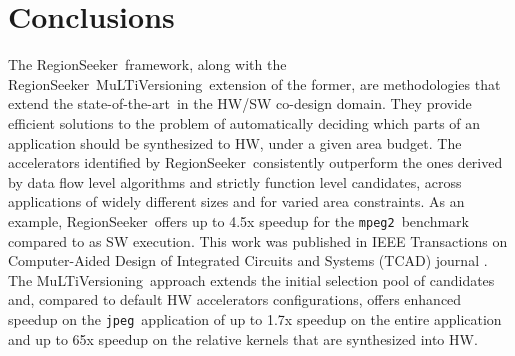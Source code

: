 \documentclass[]{usiinfthesis}
\newcommand{\rseeker}{{RegionSeeker}}
\newcommand{\multi}{MuLTiVersioning}
\newcommand{\SoTA}{{state-of-the-art}}
\newcommand{\jpeg}{\texttt{jpeg}}
\newcommand{\mpeg}{\texttt{mpeg2}}
\begin{document}





\section{Conclusions}
\label{sec:rs_conclusions}

The \rseeker\ framework, along with the \rseeker\ \multi\ extension of the former, are
methodologies that extend the \SoTA\ in the HW/SW co-design domain. They provide
efficient solutions to the problem of automatically deciding which parts of an application should
be synthesized to HW, under a given area budget. The accelerators identified by \rseeker\ 
consistently outperform the ones derived by data flow level algorithms and strictly function 
level candidates, across applications of widely different sizes and for varied area constraints.
As an example, \rseeker\ offers up to 4.5x speedup for the \mpeg\ benchmark compared to as SW
execution. This work was published in IEEE Transactions on Computer-Aided Design of Integrated 
Circuits and Systems (TCAD) journal \cite{ZacharopoulosApr19}.
The \multi\ approach extends the initial selection pool of candidates and, compared
to default HW accelerators configurations, offers enhanced speedup on the \jpeg\ application of up
to 1.7x speedup on the entire application and up to 65x speedup on the relative kernels that 
are synthesized into HW.

\end{document}
